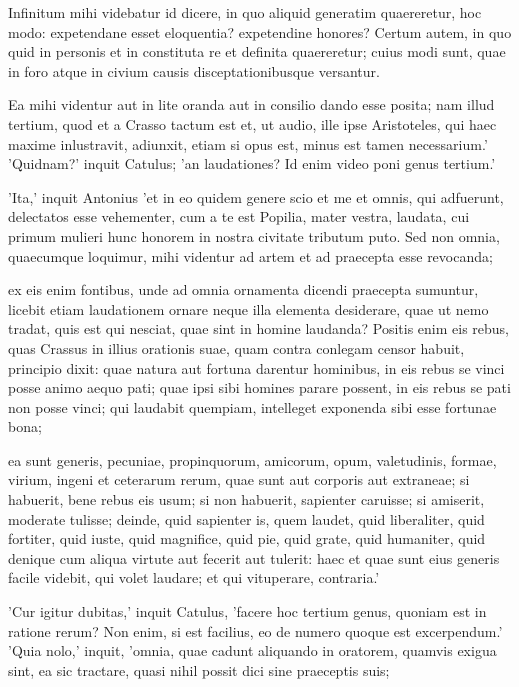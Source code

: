  Infinitum mihi videbatur id dicere, in quo aliquid generatim quaereretur, hoc modo: expetendane esset eloquentia? expetendine honores? Certum autem, in quo quid in personis et in constituta re et definita quaereretur; cuius modi sunt, quae in foro atque in civium causis disceptationibusque versantur.

 Ea mihi videntur aut in lite oranda aut in consilio dando esse posita; nam illud tertium, quod et a Crasso tactum est et, ut audio, ille ipse Aristoteles, qui haec maxime inlustravit, adiunxit, etiam si opus est, minus est tamen necessarium.' 'Quidnam?' inquit Catulus; 'an laudationes? Id enim video poni genus tertium.'

 'Ita,' inquit Antonius 'et in eo quidem genere scio et me et omnis, qui adfuerunt, delectatos esse vehementer, cum a te est Popilia, mater vestra, laudata, cui primum mulieri hunc honorem in nostra civitate tributum puto. Sed non omnia, quaecumque loquimur, mihi videntur ad artem et ad praecepta esse revocanda;

 ex eis enim fontibus, unde ad omnia ornamenta dicendi praecepta sumuntur, licebit etiam laudationem ornare neque illa elementa desiderare, quae ut nemo tradat, quis est qui nesciat, quae sint in homine laudanda? Positis enim eis rebus, quas Crassus in illius orationis suae, quam contra conlegam censor habuit, principio dixit: quae natura aut fortuna darentur hominibus, in eis rebus se vinci posse animo aequo pati; quae ipsi sibi homines parare possent, in eis rebus se pati non posse vinci; qui laudabit quempiam, intelleget exponenda sibi esse fortunae bona;

 ea sunt generis, pecuniae, propinquorum, amicorum, opum, valetudinis, formae, virium, ingeni et ceterarum rerum, quae sunt aut corporis aut extraneae; si habuerit, bene rebus eis usum; si non habuerit, sapienter caruisse; si amiserit, moderate tulisse; deinde, quid sapienter is, quem laudet, quid liberaliter, quid fortiter, quid iuste, quid magnifice, quid pie, quid grate, quid humaniter, quid denique cum aliqua virtute aut fecerit aut tulerit: haec et quae sunt eius generis facile videbit, qui volet laudare; et qui vituperare, contraria.'

 'Cur igitur dubitas,' inquit Catulus, 'facere hoc tertium genus, quoniam est in ratione rerum? Non enim, si est facilius, eo de numero quoque est excerpendum.' 'Quia nolo,' inquit, 'omnia, quae cadunt aliquando in oratorem, quamvis exigua sint, ea sic tractare, quasi nihil possit dici sine praeceptis suis;

